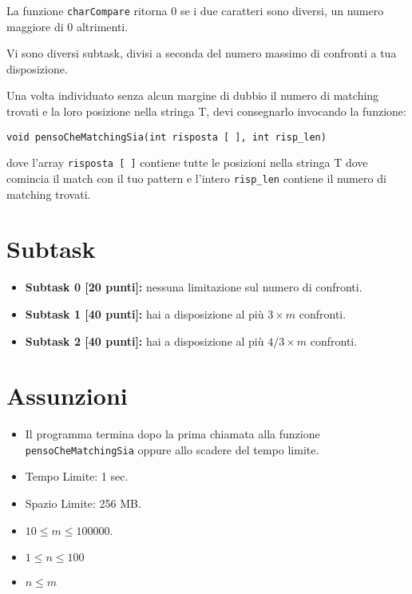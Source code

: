 \documentclass[a4paper,11pt]{article}
\begin{document}
\noindent La funzione \texttt{charCompare} ritorna $0$ se i due caratteri sono diversi, un numero maggiore di $0$ altrimenti.

\bigskip
\medskip
\noindent
Vi sono diversi subtask, divisi a seconda del numero massimo di confronti a tua disposizione. 
  
\medskip
\noindent
Una volta individuato senza alcun margine di dubbio il numero di matching trovati e la loro posizione nella stringa \textsc{T}, devi consegnarlo invocando la funzione:
  
\medskip
  
\noindent
\texttt{void pensoCheMatchingSia(int risposta [ ], int risp\_len)}

\medskip
dove l'array \texttt{risposta [ ]} contiene tutte le posizioni nella stringa \textsc{T} dove comincia il match con il tuo pattern e l'intero \texttt{risp\_len} contiene il numero di matching trovati.
  
\section*{Subtask}
\begin{itemize}
\item \textbf{Subtask 0 [20 punti]:} nessuna limitazione sul numero di confronti.
\item \textbf{Subtask 1 [40 punti]:} hai a disposizione al pi\`u $3\times m$ confronti.
\item \textbf{Subtask 2 [40 punti]:} hai a disposizione al pi\`u $4/3\times m$ confronti.
\end{itemize}
  
  \section*{Assunzioni}
  \begin{itemize}[nolistsep, noitemsep]
    \item Il programma termina dopo la prima chiamata alla funzione \texttt{pensoCheMatchingSia} oppure allo scadere del tempo limite.
    \item Tempo Limite: 1 sec.
    \item Spazio Limite: 256 MB.
    \item $ 10 \leq m \leq 100000 $.
    \item $ 1 \leq n \leq 100$ 
    \item $ n \leq m$
  \end{itemize}
\end{document}
